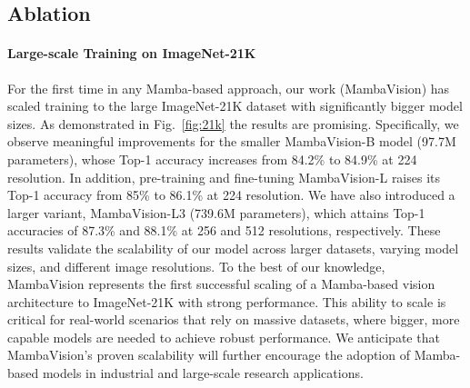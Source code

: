 \documentclass[10pt,twocolumn,letterpaper]{article}
\begin{document}
\subsection{Ablation}
\label{sec:abl}
\paragraph{Large-scale Training on ImageNet-21K} For the first time in any Mamba-based approach, our work (MambaVision) has scaled training to the large ImageNet-21K dataset with significantly bigger model sizes. As demonstrated in Fig.~\ref{fig:21k} the results are promising. Specifically, we observe meaningful improvements for the smaller MambaVision-B model (97.7M parameters), whose Top-1 accuracy increases from 84.2\% to 84.9\% at 224 resolution. In addition, pre-training and fine-tuning MambaVision-L raises its Top-1 accuracy from 85\% to 86.1\% at 224 resolution. We have also introduced a larger variant, MambaVision-L3 (739.6M parameters), which attains Top-1 accuracies of 87.3\% and 88.1\% at 256 and 512 resolutions, respectively. These results validate the scalability of our model across larger datasets, varying model sizes, and different image resolutions. To the best of our knowledge, MambaVision represents the first successful scaling of a Mamba-based vision architecture to ImageNet-21K with strong performance. This ability to scale is critical for real-world scenarios that rely on massive datasets, where bigger, more capable models are needed to achieve robust performance. We anticipate that MambaVision’s proven scalability will further encourage the adoption of Mamba-based models in industrial and large-scale research applications.
\end{document}
